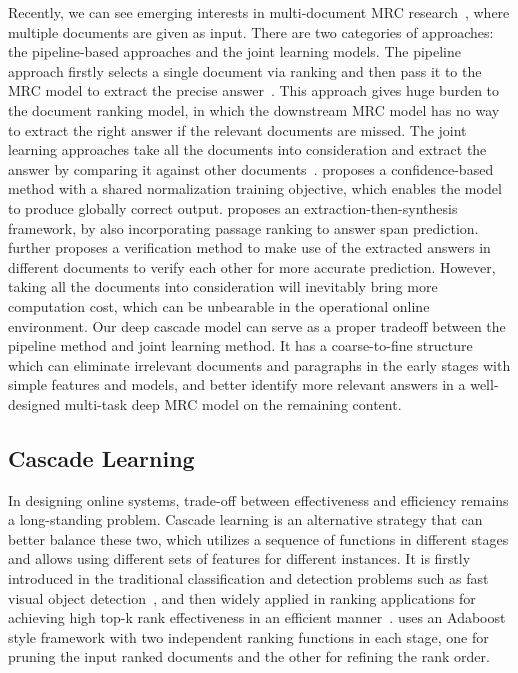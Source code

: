 \documentclass[letterpaper]{article} \usepackage{aaai19}  \usepackage{graphicx}
\begin{document}
Recently, we can see emerging interests in multi-document MRC research~\cite{nguyen2016ms,clark2017simple,wang2017evidence,he2017dureader,wang2018multi}, where multiple documents are given as input. There are two categories of approaches: the pipeline-based approaches and the joint learning models. The pipeline approach firstly selects a single document via ranking and then pass it to the MRC model to extract the precise answer~\cite{joshi2017triviaqa,wang2017r}.
This approach gives huge burden to the document ranking model, in which the downstream MRC model has no way to extract the right answer if the relevant documents are missed. The joint learning approaches take all the documents into consideration and extract the answer by comparing it against other documents~\cite{clark2017simple,tan2018s,wang2018multi}.
\cite{clark2017simple} proposes a confidence-based method with a shared normalization training objective, which enables the model to produce globally correct output. \cite{tan2018s} proposes an extraction-then-synthesis framework, by also incorporating passage ranking to answer span prediction. \cite{wang2018multi} further proposes a verification method to make use of the extracted answers in different documents to verify each other for more accurate prediction. However, taking all the documents into consideration will inevitably bring more computation cost, which can be unbearable in the operational online environment. Our deep cascade model can serve as a proper tradeoff between the pipeline method and joint learning method. It has a coarse-to-fine structure which can eliminate irrelevant documents and paragraphs in the early stages with simple features and models, and better identify more relevant answers in a well-designed multi-task deep MRC model on the remaining content.



\subsection{Cascade Learning}
In designing online systems, trade-off between effectiveness and efficiency remains a long-standing problem. Cascade learning is an alternative strategy that can better balance these two, which utilizes a sequence of functions in different stages and allows using different sets of features for different instances. It is firstly introduced in the traditional classification and detection problems such as fast visual object detection~\cite{schneiderman2004feature,bourdev2005robust}, and then widely applied in ranking applications for achieving high top-k rank effectiveness in an efficient manner~\cite{lefakis2010joint,wang2011cascade,liu2017cascade}. \cite{wang2011cascade} uses an Adaboost style framework with two independent ranking functions in each stage, one for pruning the input ranked documents and the other for refining the rank order.
\end{document}
